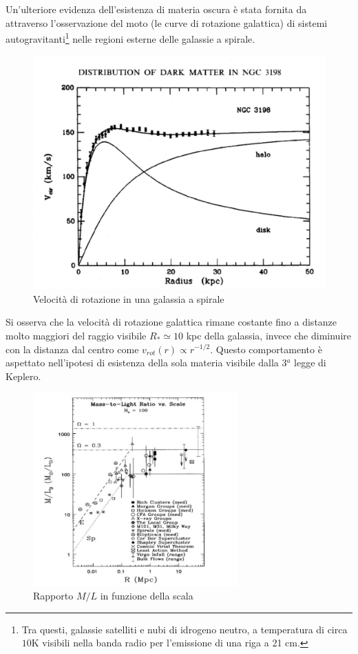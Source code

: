 Un'ulteriore evidenza dell'esistenza di materia oscura è stata fornita
da~\textcite{1970ApJ...159..379R} attraverso l'osservazione del moto (le curve
di rotazione galattica) di sistemi autogravitanti\footnote{Tra questi, galassie
  satelliti e nubi di idrogeno neutro, a temperatura di circa $10$K visibili
  nella banda radio per l'emissione di una riga a 21 cm.} nelle regioni esterne
delle galassie a spirale.
\begin{figure}
  \centering{}
  \includegraphics[width=\textwidth]{figure/Rot_vel_spir.pdf}
  \caption{Velocità di rotazione in una galassia a spirale}
  \label{vel_rot_spir}
\end{figure}
Si osserva che la velocità di rotazione galattica rimane costante fino a
distanze molto maggiori del raggio visibile $R_* \simeq 10$ kpc della galassia,
invece che diminuire con la distanza dal centro come $v_{rot}(r) \propto
r^{-1/2}$.  Questo comportamento è aspettato nell'ipotesi di esistenza della
sola materia visibile dalla 3$^a$ legge di Keplero.
\begin{figure}
  \centering{}
  \includegraphics[width=0.7\textwidth]{figure/MoverL.pdf}
  \caption{Rapporto $M/L$ in funzione della scala}
  \label{moverl}
\end{figure}


